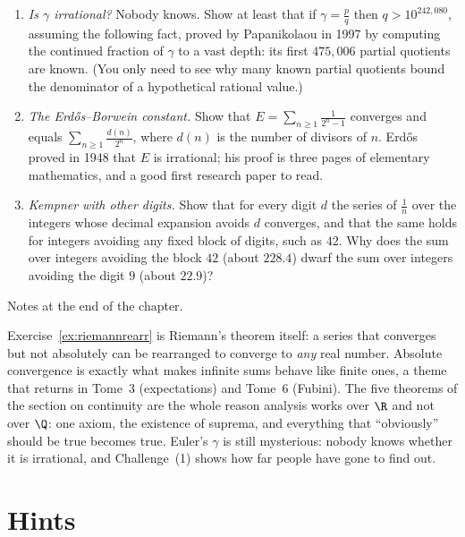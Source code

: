 \begin{challenge}
\begin{enumerate}[label=(\arabic*)]
\item \emph{Is $\gamma$ irrational?} Nobody knows. Show at least that if $\gamma=\frac pq$ then $q>10^{242{,}080}$, assuming the following fact, proved by Papanikolaou in 1997 by computing the continued fraction of $\gamma$ to a vast depth: its first $475{,}006$ partial quotients are known. (You only need to see why many known partial quotients bound the denominator of a hypothetical rational value.)
\item \emph{The Erd\H{o}s--Borwein constant.} Show that $E=\sum_{n\ge1}\frac1{2^n-1}$ converges and equals $\sum_{n\ge1}\frac{d(n)}{2^n}$, where $d(n)$ is the number of divisors of $n$. Erd\H{o}s proved in 1948 that $E$ is irrational; his proof is three pages of elementary mathematics, and a good first research paper to read.
\item \emph{Kempner with other digits.} Show that for every digit $d$ the series of $\frac1n$ over the integers whose decimal expansion avoids $d$ converges, and that the same holds for integers avoiding any fixed block of digits, such as $42$. Why does the sum over integers avoiding the block $42$ (about $228.4$) dwarf the sum over integers avoiding the digit $9$ (about $22.9$)?
\end{enumerate}
Notes at the end of the chapter.
\end{challenge}

\begin{beauty}
Exercise~\ref{ex:riemannrearr} is Riemann's theorem itself: a series that converges but not absolutely can be rearranged to converge to
\emph{any} real number. Absolute convergence is exactly what makes infinite sums behave like finite ones, a theme that returns in Tome~3
(expectations) and Tome~6 (Fubini). The five theorems of the section on continuity are the whole reason analysis works over $\R$ and not over $\Q$: one
axiom, the existence of suprema, and everything that ``obviously'' should be true becomes true. Euler's $\gamma$ is still mysterious: nobody knows
whether it is irrational, and Challenge~(1) shows how far people have gone to find out.
\end{beauty}

\section{Hints}

